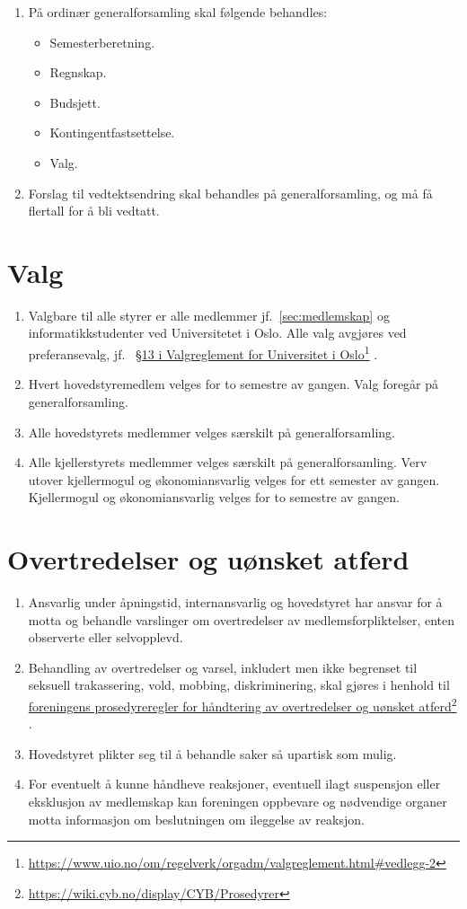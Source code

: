 \documentclass[8pt,norsk,a4paper]{article}
\newcommand\fhref[2]{%
	\href{#1}{#2}\footnote{\url{#1}}%
}
\begin{document}
\begin{enumerate}
	\item{På ordinær generalforsamling skal følgende behandles:}
	\begin{itemize}
		\item{Semesterberetning.}
		\item{Regnskap.}
		\item{Budsjett.}
		\item{Kontingentfastsettelse.}
		\item{Valg.}
	\end{itemize}
	\item{Forslag til vedtektsendring skal behandles på generalforsamling, og må få  flertall for å bli vedtatt.}
\end{enumerate}

\section{Valg}\label{sec:valg}
\begin{enumerate}
	\item{Valgbare til alle styrer er alle medlemmer jf.~\ref{sec:medlemskap} og informatikkstudenter ved Universitetet i Oslo. Alle valg avgjøres ved preferansevalg, jf.~\fhref{https://www.uio.no/om/regelverk/orgadm/valgreglement.html\#vedlegg-2}{§13 i Valgreglement for Universitet i Oslo}.}
	\item{Hvert hovedstyremedlem velges for to semestre av gangen. Valg foregår på generalforsamling.}
	\item{Alle hovedstyrets medlemmer velges særskilt på generalforsamling.}
	\item{Alle kjellerstyrets medlemmer velges særskilt på generalforsamling. Verv utover kjellermogul og økonomiansvarlig velges for ett semester av gangen. Kjellermogul og økonomiansvarlig velges for to semestre av gangen. }
\end{enumerate}

\section{Overtredelser og uønsket atferd}
\begin{enumerate}
	\item Ansvarlig under åpningstid, internansvarlig og hovedstyret har ansvar for å motta og behandle varslinger om overtredelser av medlemsforpliktelser, enten observerte eller selvopplevd.
	\item Behandling av overtredelser og varsel, inkludert men ikke begrenset til seksuell trakassering, vold, mobbing, diskriminering, skal gjøres i henhold til \fhref{https://wiki.cyb.no/display/CYB/Prosedyrer}{foreningens prosedyreregler for håndtering av overtredelser og uønsket atferd}.
	\item Hovedstyret plikter seg til å behandle saker så upartisk som mulig.
	\item For eventuelt å kunne håndheve reaksjoner, eventuell ilagt suspensjon eller eksklusjon av medlemskap kan foreningen oppbevare og nødvendige organer motta informasjon om beslutningen om ileggelse av reaksjon.
\end{enumerate}
\end{document}
